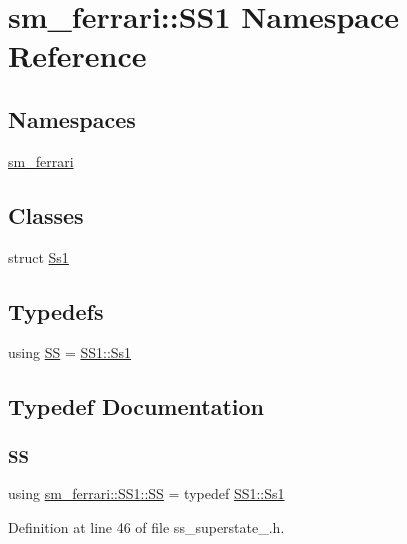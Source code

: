 \hypertarget{namespacesm__ferrari_1_1SS1}{}\section{sm\+\_\+ferrari\+:\+:S\+S1 Namespace Reference}
\label{namespacesm__ferrari_1_1SS1}
\subsection*{Namespaces}
\begin{DoxyCompactItemize}
\item 
 \hyperlink{namespacesm__ferrari_1_1SS1_1_1sm__ferrari}{sm\+\_\+ferrari}
\end{DoxyCompactItemize}
\subsection*{Classes}
\begin{DoxyCompactItemize}
\item 
struct \hyperlink{structsm__ferrari_1_1SS1_1_1Ss1}{Ss1}
\end{DoxyCompactItemize}
\subsection*{Typedefs}
\begin{DoxyCompactItemize}
\item 
using \hyperlink{namespacesm__ferrari_1_1SS1_a764bd7a6d6ba5aef49a96fefd647beb6}{SS} = \hyperlink{structsm__ferrari_1_1SS1_1_1Ss1}{S\+S1\+::\+Ss1}
\end{DoxyCompactItemize}


\subsection{Typedef Documentation}
\mbox{\label{namespacesm__ferrari_1_1SS1_a764bd7a6d6ba5aef49a96fefd647beb6}} 
\subsubsection{\texorpdfstring{SS}{SS}}
{\footnotesize\ttfamily using \hyperlink{namespacesm__ferrari_1_1SS1_a764bd7a6d6ba5aef49a96fefd647beb6}{sm\+\_\+ferrari\+::\+S\+S1\+::\+SS} = typedef \hyperlink{structsm__ferrari_1_1SS1_1_1Ss1}{S\+S1\+::\+Ss1}}



Definition at line 46 of file ss\+\_\+superstate\+\_.\+h.

